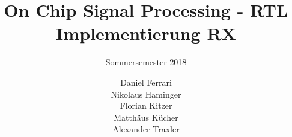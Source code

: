 


\pagestyle{scrheadings}
\clearscrheadfoot


\ofoot{\emph{\thepage \ / \ \pageref{LastPage}}}


\posttitle{\end{center}}

\title{On Chip Signal Processing - RTL Implementierung RX}
\subtitle{Sommersemester 2018}
\author{Daniel Ferrari \\ Nikolaus Haminger \\ Florian Kitzer \\ Matthäus Kücher \\ Alexander Traxler}


\maketitle %
%
\tableofcontents

